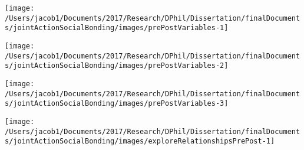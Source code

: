 \documentclass[english]{article}\usepackage[]{graphicx}\usepackage[]{color}
\makeatletter
\def\maxwidth{ %
  \ifdim\Gin@nat@width>\linewidth
    \linewidth
  \else
    \Gin@nat@width
  \fi
}
\newenvironment{kframe}{%
 \def\at@end@of@kframe{}%
 \ifinner\ifhmode%
  \def\at@end@of@kframe{\end{minipage}}%
  \begin{minipage}{\columnwidth}%
 \fi\fi%
 \def\FrameCommand##1{\hskip\@totalleftmargin \hskip-\fboxsep
 \colorbox{shadecolor}{##1}\hskip-\fboxsep
     \hskip-\linewidth \hskip-\@totalleftmargin \hskip\columnwidth}%
 \MakeFramed {\advance\hsize-\width
   \@totalleftmargin\z@ \linewidth\hsize
   \@setminipage}}%
 {\par\unskip\endMakeFramed%
 \at@end@of@kframe}
\newenvironment{knitrout}{}{} %
\makeatother
\begin{document}
\begin{knitrout}
\color{fgcolor}\begin{kframe}


{\ttfamily\noindent\bfseries\color{errorcolor}{\#\# Error in `\$<-.data.frame`(`*tmp*`, groupPerfChangePrePost, value = integer(0)): replacement has 0 rows, data has 156}}

{\ttfamily\noindent\bfseries\color{errorcolor}{\#\# Error in hist.default(tlc\$groupPerfChangePrePost[tlc\$time == 3], main = NA, : 'x' must be numeric}}

{\ttfamily\noindent\bfseries\color{errorcolor}{\#\# Error in hist.default(tlc\$indPerfChangePrePost[tlc\$time == 3], main = NA, : invalid number of 'breaks'}}\end{kframe}

{\centering \texttt{[image: /Users/jacob1/Documents/2017/Research/DPhil/Dissertation/finalDocuments/jointActionSocialBonding/images/prePostVariables-1]} 

}




{\centering \texttt{[image: /Users/jacob1/Documents/2017/Research/DPhil/Dissertation/finalDocuments/jointActionSocialBonding/images/prePostVariables-2]} 

}




{\centering \texttt{[image: /Users/jacob1/Documents/2017/Research/DPhil/Dissertation/finalDocuments/jointActionSocialBonding/images/prePostVariables-3]} 

}



\end{knitrout}

\begin{knitrout}
\color{fgcolor}\begin{kframe}


{\ttfamily\noindent\bfseries\color{errorcolor}{\#\# Error in xy.coords(x, y, xlabel, ylabel, log): 'x' and 'y' lengths differ}}\end{kframe}

{\centering \texttt{[image: /Users/jacob1/Documents/2017/Research/DPhil/Dissertation/finalDocuments/jointActionSocialBonding/images/exploreRelationshipsPrePost-1]} 

}


\begin{kframe}

{\ttfamily\noindent\bfseries\color{errorcolor}{\#\# Error in xy.coords(x, y, xlabel, ylabel, log): 'x' and 'y' lengths differ}}\end{kframe}
\end{knitrout}
\end{document}
